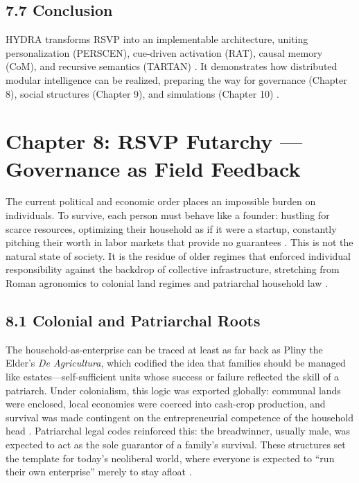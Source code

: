 \documentclass[12pt]{article}
\begin{document}
\subsection*{7.7 Conclusion}
HYDRA transforms RSVP into an implementable architecture, uniting personalization (PERSCEN), cue-driven activation (RAT), causal memory (CoM), and recursive semantics (TARTAN) \citep{bird1988, milewski2018}. It demonstrates how distributed modular intelligence can be realized, preparing the way for governance (Chapter 8), social structures (Chapter 9), and simulations (Chapter 10) \citep{whitehead1978}.

\section*{Chapter 8: RSVP Futarchy --- Governance as Field Feedback}
The current political and economic order places an impossible burden on individuals. To survive, each person must behave like a founder: hustling for scarce resources, optimizing their household as if it were a startup, constantly pitching their worth in labor markets that provide no guarantees \citep{zuboff2019}. This is not the natural state of society. It is the residue of older regimes that enforced individual responsibility against the backdrop of collective infrastructure, stretching from Roman agronomics to colonial land regimes and patriarchal household law \citep{lanier2018}.
\subsection*{8.1 Colonial and Patriarchal Roots}
The household-as-enterprise can be traced at least as far back as Pliny the Elder's \textit{De Agricultura}, which codified the idea that families should be managed like estates---self-sufficient units whose success or failure reflected the skill of a patriarch. Under colonialism, this logic was exported globally: communal lands were enclosed, local economies were coerced into cash-crop production, and survival was made contingent on the entrepreneurial competence of the household head \citep{ortega1957}. Patriarchal legal codes reinforced this: the breadwinner, usually male, was expected to act as the sole guarantor of a family's survival. These structures set the template for today's neoliberal world, where everyone is expected to ``run their own enterprise'' merely to stay afloat \citep{zuboff2019}.
\end{document}
